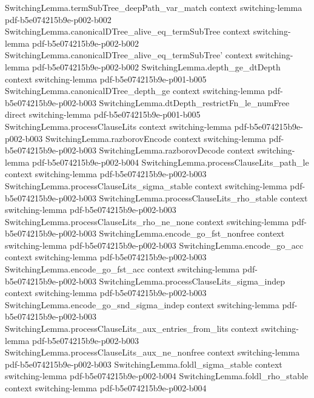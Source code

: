 \begin{theorem}
\proofstep
  {SwitchingLemma.termSubTree_deepPath_var_match}
  {context}
  {switching-lemma}
  {pdf-b5e074215b9e-p002-b002}
\proofstep
  {SwitchingLemma.canonicalDTree_alive_eq_termSubTree}
  {context}
  {switching-lemma}
  {pdf-b5e074215b9e-p002-b002}
\proofstep
  {SwitchingLemma.canonicalDTree_alive_eq_termSubTree'}
  {context}
  {switching-lemma}
  {pdf-b5e074215b9e-p002-b002}
\proofstep
  {SwitchingLemma.depth_ge_dtDepth}
  {context}
  {switching-lemma}
  {pdf-b5e074215b9e-p001-b005}
\proofstep
  {SwitchingLemma.canonicalDTree_depth_ge}
  {context}
  {switching-lemma}
  {pdf-b5e074215b9e-p002-b003}
\proofstep
  {SwitchingLemma.dtDepth_restrictFn_le_numFree}
  {direct}
  {switching-lemma}
  {pdf-b5e074215b9e-p001-b005}
\proofstep
  {SwitchingLemma.processClauseLits}
  {context}
  {switching-lemma}
  {pdf-b5e074215b9e-p002-b003}
\proofstep
  {SwitchingLemma.razborovEncode}
  {context}
  {switching-lemma}
  {pdf-b5e074215b9e-p002-b003}
\proofstep
  {SwitchingLemma.razborovDecode}
  {context}
  {switching-lemma}
  {pdf-b5e074215b9e-p002-b004}
\proofstep
  {SwitchingLemma.processClauseLits_path_le}
  {context}
  {switching-lemma}
  {pdf-b5e074215b9e-p002-b003}
\proofstep
  {SwitchingLemma.processClauseLits_sigma_stable}
  {context}
  {switching-lemma}
  {pdf-b5e074215b9e-p002-b003}
\proofstep
  {SwitchingLemma.processClauseLits_rho_stable}
  {context}
  {switching-lemma}
  {pdf-b5e074215b9e-p002-b003}
\proofstep
  {SwitchingLemma.processClauseLits_rho_ne_none}
  {context}
  {switching-lemma}
  {pdf-b5e074215b9e-p002-b003}
\proofstep
  {SwitchingLemma.encode_go_fst_nonfree}
  {context}
  {switching-lemma}
  {pdf-b5e074215b9e-p002-b003}
\proofstep
  {SwitchingLemma.encode_go_acc}
  {context}
  {switching-lemma}
  {pdf-b5e074215b9e-p002-b003}
\proofstep
  {SwitchingLemma.encode_go_fst_acc}
  {context}
  {switching-lemma}
  {pdf-b5e074215b9e-p002-b003}
\proofstep
  {SwitchingLemma.processClauseLits_sigma_indep}
  {context}
  {switching-lemma}
  {pdf-b5e074215b9e-p002-b003}
\proofstep
  {SwitchingLemma.encode_go_snd_sigma_indep}
  {context}
  {switching-lemma}
  {pdf-b5e074215b9e-p002-b003}
\proofstep
  {SwitchingLemma.processClauseLits_aux_entries_from_lits}
  {context}
  {switching-lemma}
  {pdf-b5e074215b9e-p002-b003}
\proofstep
  {SwitchingLemma.processClauseLits_aux_ne_nonfree}
  {context}
  {switching-lemma}
  {pdf-b5e074215b9e-p002-b003}
\proofstep
  {SwitchingLemma.foldl_sigma_stable}
  {context}
  {switching-lemma}
  {pdf-b5e074215b9e-p002-b004}
\proofstep
  {SwitchingLemma.foldl_rho_stable}
  {context}
  {switching-lemma}
  {pdf-b5e074215b9e-p002-b004}

\end{theorem}
